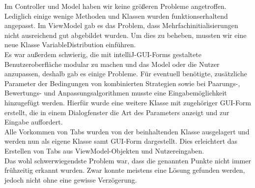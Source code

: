 Im Controller und Model haben wir keine größeren Probleme angetroffen. Lediglich einige wenige Methoden und Klassen wurden funktionserhaltend angepasst.
Im ViewModel gab es das Problem, dass Mehrfachinitialisierungen nicht ausreichend gut abgebildet wurden. Um dies zu beheben, mussten wir eine neue Klasse VariableDistribution einführen. \\
Es war außerdem schwierig, die mit intelliJ-GUI-Forms gestaltete Benutzeroberfläche modular zu machen und das Model oder die Nutzer anzupassen, deshalb gab es einige Probleme. %
Für eventuell benötigte, zusätzliche Parameter der Bedingungen von kombinierten Strategien sowie bei Paarungs-, Bewertungs- und Anpassungsalgorithmen musste eine Eingabemöglichkeit hinzugefügt werden. Hierfür wurde eine weitere Klasse mit zugehöriger GUI-Form erstellt, die in einem Dialogfenster die Art des Parameters anzeigt und zur Eingabe auffordert.\\
Alle Vorkommen von Tabs wurden von der beinhaltenden Klasse ausgelagert und werden nun als eigene Klasse samt GUI-Form dargestellt. Dies erleichtert das Erstellen von Tabs aus ViewModel-Objekten und Nutzereingaben.\\
Das wohl schwerwiegendste Problem war, dass die genannten Punkte nicht immer frühzeitig erkannt wurden. Zwar konnte meistens eine Lösung gefunden werden, jedoch nicht ohne eine gewisse Verzögerung.